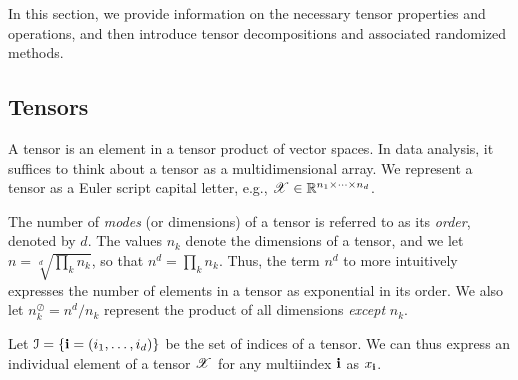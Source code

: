 In this section, we provide information on the necessary tensor properties and operations, and then introduce tensor decompositions and associated randomized methods.
%
\subsection{Tensors}
A tensor is an element in a tensor product of vector spaces. In data analysis, 
it suffices to think about a tensor as a multidimensional array.
We represent a tensor as a Euler script capital letter, e.g., 
$\T{X}\in \R^{n_1 \times \cdots \times n_d}$. 

The number of \emph{modes} (or dimensions) of a tensor is referred to as its \emph{order}, 
denoted by $d$. The values $n_k$ denote the dimensions of a tensor, and we let $n=\sqrt[d]{\prod_k n_k}$, 
so that $n^d = \prod_k n_k$. Thus, the term $n^d$ to more intuitively expresses the number of elements 
 in a tensor as exponential in its order. We also let $n_k^\oslash = n^d / n_k$ represent the product of all 
 dimensions \emph{except} $n_k$.

Let $\mathcal{I} = \{ \V{i} = (i_1,\dots,i_d) \}$ be the set of indices of a tensor. 
We can thus express an individual element of a tensor $\T{X}$ for any multiindex $\V{i}$ as $x_{\V{i}}$. 

